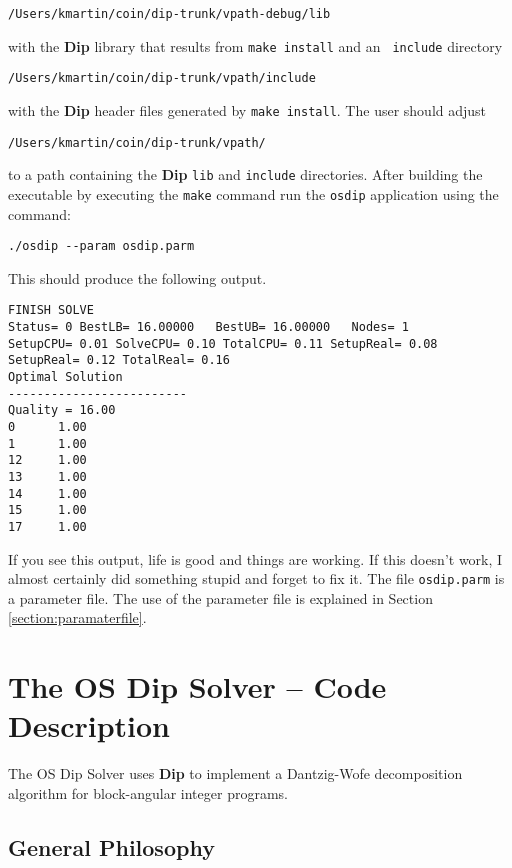 \documentclass[11pt]{article}
\renewcommand{\_}{{\char"5F}}
\renewcommand{\{}{{\char"7B}}
\renewcommand{\}}{{\char"7D}}
\renewcommand{\^}{{\char"0D}}
\renewcommand{\'}{{\char"0D}}
\begin{document}
\begin{verbatim}
/Users/kmartin/coin/dip-trunk/vpath-debug/lib
\end{verbatim}
with the {\bf Dip} library that results from {\tt make install} and an {\tt
include} directory
\begin{verbatim}
/Users/kmartin/coin/dip-trunk/vpath/include
\end{verbatim}
with the {\bf Dip} header files generated by {\tt make install}.  The user
should adjust
\begin{verbatim}
/Users/kmartin/coin/dip-trunk/vpath/
\end{verbatim}
to a path containing the {\bf Dip} {\tt lib} and {\tt include} directories. 
After building the executable by executing the {\tt make} command run the {\tt osdip} application using the command:

\begin{verbatim}
./osdip --param osdip.parm
\end{verbatim}

This should produce the following output.


\begin{verbatim}
FINISH SOLVE
Status= 0 BestLB= 16.00000   BestUB= 16.00000   Nodes= 1      
SetupCPU= 0.01 SolveCPU= 0.10 TotalCPU= 0.11 SetupReal= 0.08 
SetupReal= 0.12 TotalReal= 0.16
Optimal Solution
-------------------------
Quality = 16.00
0      1.00
1      1.00
12     1.00
13     1.00
14     1.00
15     1.00
17     1.00

\end{verbatim}

If you see this output, life is good and things are working. If this doesn't
work, I almost certainly did something stupid and forget to fix it.  The file
{\tt osdip.parm} is a parameter file. The use of the parameter file is 
explained in Section \ref{section:paramaterfile}.


\section{The OS Dip Solver -- Code Description}\label{section:osdipsolver}

The OS Dip Solver uses {\bf Dip} to implement a Dantzig-Wofe decomposition
algorithm for block-angular integer programs. 

\subsection{General Philosophy}
\end{document}
